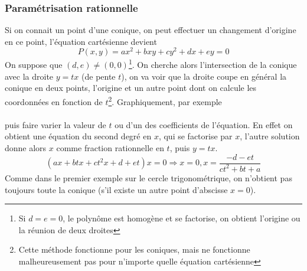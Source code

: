 \documentclass[a4paper,11pt]{article}
\begin{document}
\begin{giacjshere}
\subsubsection{Param\'etrisation rationnelle}
Si on connait un point d'une conique, on peut effectuer
un changement d'origine en ce point, l'\'equation cart\'esienne
devient
$$P(x,y)=ax^2+bxy+cy^2+dx+ey=0$$
On suppose que $(d,e)\neq(0,0)$\footnote{Si $d=e=0$, le
polyn\^ome est homog\`ene et se factorise,
on obtient l'origine ou la r\'eunion de deux droites}.
On cherche alors l'intersection de la conique avec la droite $y=tx$
(de pente $t$), on va voir que la droite coupe en g\'en\'eral la
conique en deux points, l'origine et un autre point dont on
calcule les coordonn\'ees en fonction de $t$\footnote{Cette m\'ethode
fonctionne pour les coniques, mais ne fonctionne malheureusement
pas pour n'importe quelle \'equation cart\'esienne}.
Graphiquement, par exemple\\
\\
puis faire varier la valeur de $t$ ou d'un des coefficients de
l'\'equation.
En effet on obtient une \'equation du second degr\'e en $x$,
qui se factorise par $x$, l'autre solution donne alors $x$ comme
fraction rationnelle en $t$, puis $y=tx$.
$$ (ax+btx+ct^2x+d+et)x=0 \Rightarrow x=0, x=\frac{-d-et}{ct^2+bt+a}$$
Comme dans le premier exemple sur le cercle trigonom\'etrique,
on n'obtient pas toujours toute la conique (s'il existe un autre
point d'abscisse $x=0$).


\end{giacjshere}
\end{document}

